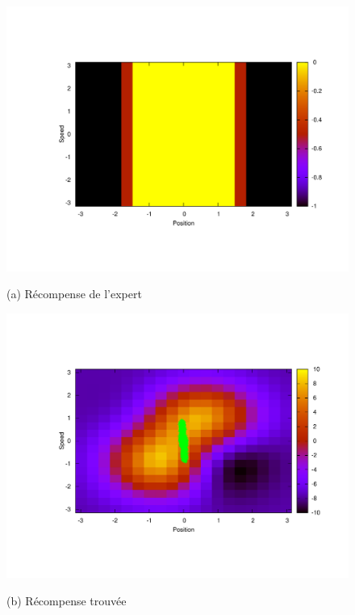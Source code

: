 \documentclass{article}
\begin{document}
\begin{figure}[tb]
%
\begin{minipage}[b]{.5\linewidth}
  \centering
  \centerline{\includegraphics[width=1.2\linewidth]{LAFEM_Exp3_true_R.pdf}}
  \centerline{(a) Récompense de l'expert}%
\end{minipage}
\hfill
\begin{minipage}[b]{.5\linewidth}
  \centering
  \centerline{\includegraphics[width=1.2\linewidth]{LAFEM_Exp3_lafem_R.pdf}}
  \centerline{(b) Récompense trouvée}%
\end{minipage}
\begin{minipage}[b]{.5\linewidth}
  \centering

\end{minipage}
\end{figure}
\end{document}

